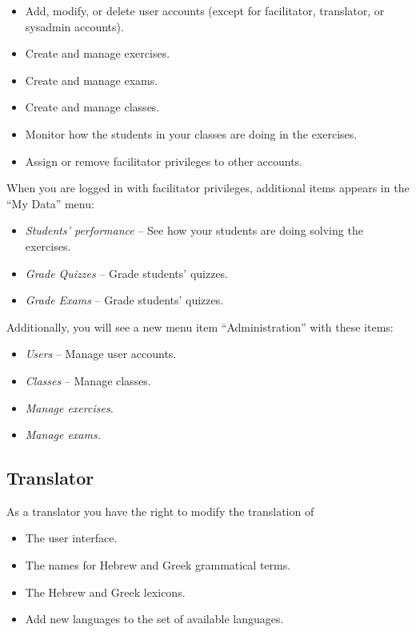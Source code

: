\documentclass[11pt,oneside,a4paper]{memoir}
\begin{document}
\begin{itemize}
\item Add, modify, or delete user accounts (except for facilitator, translator, or sysadmin accounts).
\item Create and manage exercises.
\item Create and manage exams.
\item Create and manage classes.
\item Monitor how the students in your classes are doing in the exercises.
\item Assign or remove facilitator privileges to other accounts.
\end{itemize}

When you are logged in with facilitator privileges, additional items appears in the ``My Data'' menu:

\begin{itemize}
\item \emph{Students' performance} -- See how your students are doing solving the exercises.
\item \emph{Grade Quizzes} -- Grade students' quizzes.
\item \emph{Grade Exams} -- Grade students' quizzes.
\end{itemize}

Additionally, you will see a new menu item ``Administration'' with these items:

\begin{itemize}
\item \emph{Users} -- Manage user accounts.
\item \emph{Classes} -- Manage classes.
\item \emph{Manage exercises.}
\item \emph{Manage exams.}
\end{itemize}


\subsection{Translator}

As a translator you have the right to modify the translation of

\begin{itemize}
\item The user interface.
\item The names for Hebrew and Greek grammatical terms.
\item The Hebrew and Greek lexicons.
\item Add new languages to the set of available languages.
\end{itemize}
\end{document}

